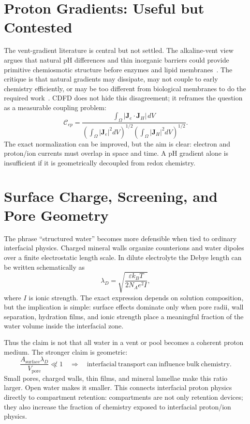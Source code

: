 \documentclass[11pt,a4paper]{article}
\begin{document}
\section{Proton Gradients: Useful but Contested}
The vent-gradient literature is central but not settled. The alkaline-vent view argues that natural pH differences and thin inorganic barriers could provide primitive chemiosmotic structure before enzymes and lipid membranes~\cite{Lane2010,Sojo2016,Lane2017}. The critique is that natural gradients may dissipate, may not couple to early chemistry efficiently, or may be too different from biological membranes to do the required work~\cite{Jackson2016}. CDFD does not hide this disagreement; it reframes the question as a measurable coupling problem:
\begin{equation}
\mathcal{C}_{ep}
=
\frac{\int_{\Omega} |\bm{J}_e\cdot\bm{J}_H|\,dV}
{\left(\int_{\Omega}|\bm{J}_e|^2dV\right)^{1/2}
\left(\int_{\Omega}|\bm{J}_H|^2dV\right)^{1/2}}.
\end{equation}
The exact normalization can be improved, but the aim is clear: electron and proton/ion currents must overlap in space and time. A pH gradient alone is insufficient if it is geometrically decoupled from redox chemistry.

\section{Surface Charge, Screening, and Pore Geometry}
The phrase ``structured water'' becomes more defensible when tied to ordinary interfacial physics. Charged mineral walls organize counterions and water dipoles over a finite electrostatic length scale. In dilute electrolyte the Debye length can be written schematically as
\begin{equation}
\lambda_D
=
\sqrt{\frac{\varepsilon k_BT}{2N_A e^2 I}},
\end{equation}
where $I$ is ionic strength. The exact expression depends on solution composition, but the implication is simple: surface effects dominate only when pore radii, wall separation, hydration films, and ionic strength place a meaningful fraction of the water volume inside the interfacial zone.

Thus the claim is not that all water in a vent or pool becomes a coherent proton medium. The stronger claim is geometric:
\begin{equation}
\frac{A_{\mathrm{surface}}\lambda_D}{V_{\mathrm{pore}}}
\not\ll
1
\quad\Rightarrow\quad
\mathrm{interfacial\ transport\ can\ influence\ bulk\ chemistry}.
\end{equation}
Small pores, charged walls, thin films, and mineral lamellae make this ratio larger. Open water makes it smaller. This connects interfacial proton physics directly to compartment retention: compartments are not only retention devices; they also increase the fraction of chemistry exposed to interfacial proton/ion physics.
\end{document}
